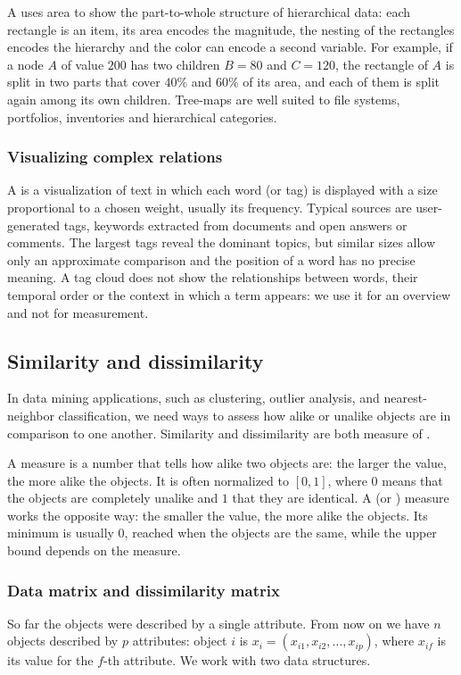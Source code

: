 A  uses area to show the part-to-whole structure of hierarchical data: each rectangle is an item, its area encodes the magnitude, the nesting of the rectangles encodes the hierarchy and the color can encode a second variable. For example, if a node $A$ of value $200$ has two children $B=80$ and $C=120$, the rectangle of $A$ is split in two parts that cover $40\%$ and $60\%$ of its area, and each of them is split again among its own children. Tree-maps are well suited to file systems, portfolios, inventories and hierarchical categories.

\subsubsection{Visualizing complex relations}
A  is a visualization of text in which each word (or tag) is displayed with a size proportional to a chosen weight, usually its frequency. Typical sources are user-generated tags, keywords extracted from documents and open answers or comments. The largest tags reveal the dominant topics, but similar sizes allow only an approximate comparison and the position of a word has no precise meaning. A tag cloud does not show the relationships between words, their temporal order or the context in which a term appears: we use it for an overview and not for measurement.

\subsection{Similarity and dissimilarity}

In data mining applications, such as clustering, outlier analysis, and nearest-neighbor classification, we
need ways to assess how alike or unalike objects are in comparison to one another. Similarity and dissimilarity are both measure of .

A  measure is a number that tells how alike two objects are: the larger the value, the more alike the objects. It is often normalized to $[0,1]$, where $0$ means that the objects are completely unalike and $1$ that they are identical. A  (or ) measure works the opposite way: the smaller the value, the more alike the objects. Its minimum is usually $0$, reached when the objects are the same, while the upper bound depends on the measure.

\subsubsection{Data matrix and dissimilarity matrix}
So far the objects were described by a single attribute. From now on we have $n$ objects described by $p$ attributes: object $i$ is $x_i=(x_{i1},x_{i2},\dots,x_{ip})$, where $x_{if}$ is its value for the $f$-th attribute. We work with two data structures.

